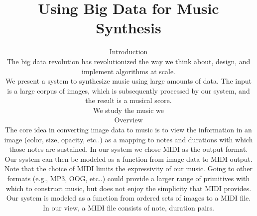 \documentclass[10pt, conference, compsocconf]{IEEEtran}
\newcommand{\comment}[3][\color{red}]{{#1{[{#2}: {#3}]}}}
\newcommand{\kris}[1]{\comment[\color{orange}]{km}{#1}}
\begin{document}
%

\title{Using Big Data for Music Synthesis}

\author{

\maketitle

\begin{abstract}
\end{abstract}

\section{Introduction}
\label{sec:introduction}

The big data revolution has revolutionized the way we think about,
design, and implement algorithms at scale.  

We present a system to synthesize music using large amounts of data.
The input is a large corpus of images, which is subsequently processed
by our system, and the result is a musical score.

We study the music we 

\section{Overview}
\label{sec:overview}

The core idea in converting image data to music is to view the
information in an image (color, size, opacity, etc..) as a mapping to
notes and durations with which those notes are sustained.  In our
system we chose MIDI as the output format.  Our system can then be
modeled as a function \kris{transducer?} from image data to MIDI
output.  Note that the choice of MIDI limits the expressivity of our
music.  Going to other formats (e.g., MP3, OOG, etc..) could provide a
larger range of primitives with which to construct music, but does not
enjoy the simplicity that MIDI provides.

Our system is modeled as a function from ordered sets of images to a
MIDI file.  In our view, a MIDI file consists of note, duration pairs.


}
\end{document}
